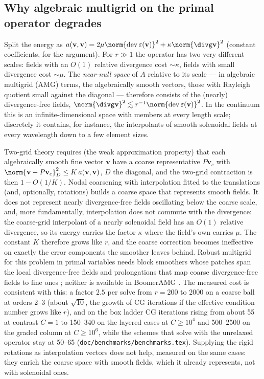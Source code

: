 \documentclass[11pt]{article}
\numberwithin{equation}{section}
\theoremstyle{remark}
\newcommand{\eps}{\varepsilon}
\newcommand{\dev}{\operatorname{dev}}
\newcommand{\vv}{\mathbf{v}}
\newcommand{\code}[1]{\texttt{#1}}
\begin{document}
\subsection{Why algebraic multigrid on the primal operator degrades}
\label{sec:amg}

Split the energy as $a(\vv,\vv) = 2\mu\norm{\dev\eps(\vv)}^2 +
\kappa\norm{\divg\vv}^2$ (constant coefficients, for the argument). For
$r\gg1$ the operator has two very different scales: fields with an
$O(1)$ relative divergence cost $\sim\kappa$, fields with small divergence
cost $\sim\mu$. The \emph{near-null space} of $A$ relative to its scale
--- in algebraic multigrid (AMG) terms, the algebraically smooth vectors,
those with Rayleigh quotient small against the diagonal --- therefore
consists of the (nearly) divergence-free fields, $\norm{\divg\vv}^2\lesssim
r^{-1}\norm{\dev\eps(\vv)}^2$. In the continuum this is an
infinite-dimensional space with members at every length scale; discretely
it contains, for instance, the interpolants of smooth solenoidal fields at
every wavelength down to a few element sizes.

Two-grid theory requires (the weak approximation property) that each
algebraically smooth fine vector $\vv$ have a coarse representative
$P\vv_c$ with $\norm{\vv - P\vv_c}_{D}^2 \le K\,a(\vv,\vv)$, $D$ the
diagonal, and the two-grid contraction is then $1 - O(1/K)$. Nodal
coarsening with interpolation fitted to the translations (and, optionally,
rotations) builds a coarse space that represents smooth fields. It does
not represent nearly divergence-free fields oscillating below the coarse
scale, and, more fundamentally, interpolation does not commute with the
divergence: the coarse-grid interpolant of a nearly solenoidal field has
an $O(1)$ relative divergence, so its energy carries the factor $\kappa$
where the field's own carries $\mu$. The constant $K$ therefore grows like
$r$, and the coarse correction becomes ineffective on exactly the error
components the smoother leaves behind. Robust multigrid for this problem
in primal variables needs block smoothers whose patches span the local
divergence-free fields and prolongations that map coarse
divergence-free fields to fine ones \cite{Schoberl1999,LWXZ2007}; neither
is available in BoomerAMG \cite{HensonYang2002}. The measured cost is
consistent with this: a factor $2.5$ per solve from $r = 200$ to $2000$ on
a coarse ball at orders 2--3 (about $\sqrt{10}$, the growth of CG
iterations if the effective condition number grows like $r$), and on the
box ladder CG iterations rising from about 55 at contrast $C = 1$ to
150--340 on the layered cases at $C\ge10^4$ and 500--2500 on the graded
column at $C\ge10^6$, while the schemes that solve with the unrelaxed
operator stay at 50--65 (\code{doc/benchmarks/benchmarks.tex}). Supplying the rigid
rotations as interpolation vectors does not help, measured on the same
cases: they enrich the coarse space with
smooth fields, which it already represents, not with solenoidal ones.
\end{document}

